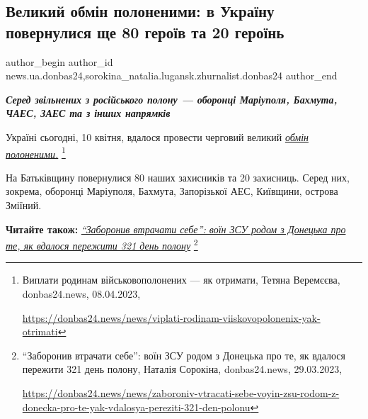  
 
 
 
 
 
\subsection{Великий обмін полоненими: в Україну повернулися ще 80 героїв та 20 героїнь}
\label{sec:10_04_2023.stz.news.ua.donbas24.2.velykyj_obmin_polonenymy_80_geroiv_20_geroinj}
 
\ifcmt
 author_begin
   author_id news.ua.donbas24,sorokina_natalia.lugansk.zhurnalist.donbas24
 author_end
\fi

\begin{center}
  \em\color{blue}\bfseries\Large
  Серед звільнених з російського полону — оборонці Маріуполя, Бахмута, ЧАЕС, ЗАЕС та з інших напрямків
\end{center}

Україні сьогодні, 10 квітня, вдалося провести черговий великий \href{https://donbas24.news/news/viplati-rodinam-viiskovopolonenix-yak-otrimati}{\emph{обмін полоненими.}}%
\footnote{Виплати родинам військовополонених — як отримати, Тетяна Веремєєва, donbas24.news, 08.04.2023, \par\url{https://donbas24.news/news/viplati-rodinam-viiskovopolonenix-yak-otrimati}}

На Батьківщину повернулися 80 наших захисників та 20 захисниць. Серед них,
зокрема, оборонці Маріуполя, Бахмута, Запорізької АЕС, Київщини, острова
Зміїний.

\textbf{Читайте також:} \href{https://donbas24.news/news/zaboroniv-vtracati-sebe-voyin-zsu-rodom-z-donecka-pro-te-yak-vdalosya-pereziti-321-den-polonu}{\emph{\enquote{Заборонив втрачати себе}: воїн ЗСУ родом з Донецька про те, як вдалося пережити 321 день полону}}%
\footnote{\enquote{Заборонив втрачати себе}: воїн ЗСУ родом з Донецька про те, як вдалося пережити 321 день полону, Наталія Сорокіна, donbas24.news, 29.03.2023, \par%
\url{https://donbas24.news/news/zaboroniv-vtracati-sebe-voyin-zsu-rodom-z-donecka-pro-te-yak-vdalosya-pereziti-321-den-polonu}%
}

